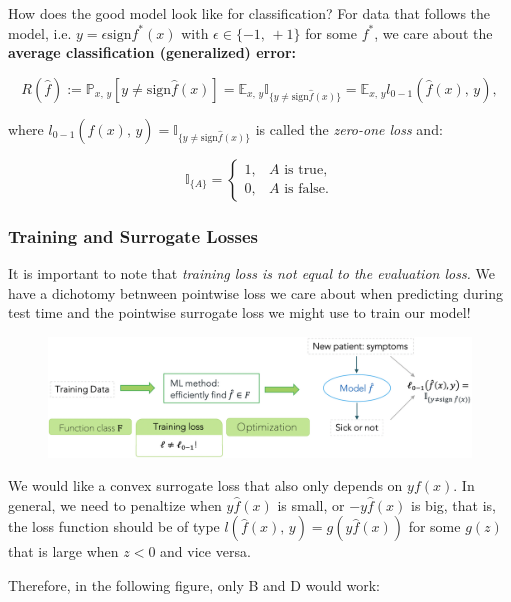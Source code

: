 \documentclass[a4paper]{extarticle}
\begin{document}
How does the good model look like for classification? For data that follows the model, i.e. \(y = \epsilon \text{sign} f^*(x)\) with \(\epsilon \in \{-1, \, +1\}\) for some \(f^*\), we care about the \textbf{average classification (generalized) error:}

\[
    R(\hat{f}) := \mathbb{P}_{x, \, y}[y \neq \text{sign} \hat{f}(x)] = \mathbb{E}_{x, \, y} \mathbb{I}_{\{y \neq \text{sign} \hat{f}(x)\}} = \mathbb{E}_{x, \, y} l_{0-1}(\hat{f}(x), \, y),
\]

where \(l_{0 - 1}(\hat{f}(x), \, y) = \mathbb{I}_{\{y \neq \text{sign}\hat{f}(x)\}}\) is called the \textit{zero-one loss} and:

\[
    \mathbb{I}_{\{A\}} = \begin{cases}
        1, &A \text{ is true}, \\
        0, &A \text{ is false}.
    \end{cases}
\]

\subsubsection{Training and Surrogate Losses}

It is important to note that \textit{training loss is not equal to the evaluation loss.} We have a dichotomy betnween pointwise loss we care about when predicting during test time and the pointwise surrogate loss we might use to train our model!

\begin{figure}[H]
    \includegraphics[width=15cm]{../images/IntroML_Fig4-3}
    \centering
\end{figure}

We would like a convex surrogate loss that also only depends on \(yf(x)\). In general, we need to penaltize when \(y\hat{f}(x)\) is small, or \(-y\hat{f}(x)\) is big, that is, the loss function should be of type \(l(\hat{f}(x), \, y) = g(y\hat{f}(x))\) for some \(g(z)\) that is large when \(z < 0\) and vice versa.

Therefore, in the following figure, only B and D would work:
\end{document}

